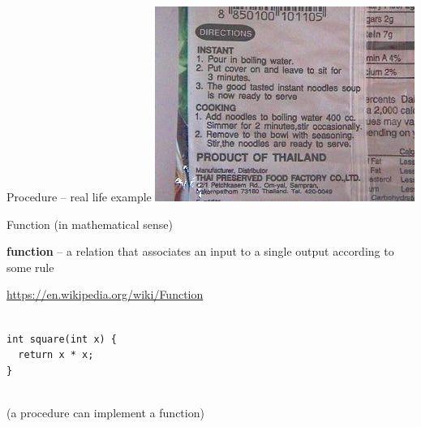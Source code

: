 \documentclass{beamer}
\begin{document}
\begin{frame}{Procedure -- real life example}
  \includegraphics[width=\textwidth]{instant-soup.jpg}
\end{frame}

\begin{frame}{Function (in mathematical sense)}

  \begin{displayquote}
    \textbf{function} -- a relation that associates an input to
    a single output according to some rule
  \end{displayquote}
  \begin{flushright}  
    {\footnotesize \url{https://en.wikipedia.org/wiki/Function}} \\ \pause
  \end{flushright}
  \ \\
  \texttt{int square(int x) \{\\
    \ \ return x * x; \\
    \}} \pause \\
  \ \\
  \begin{center}
    {\footnotesize (a procedure can implement a function)}
  \end{center}
\end{frame}
\end{document}
